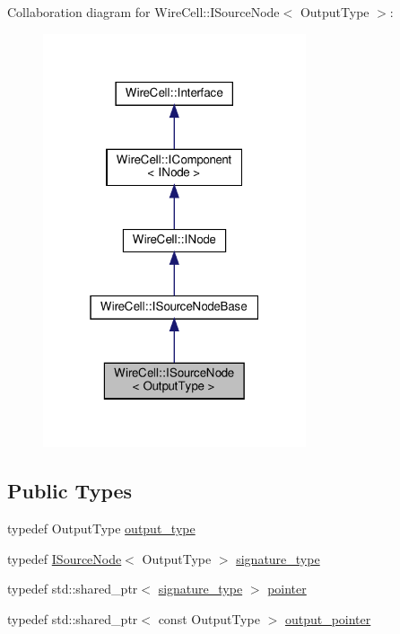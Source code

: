 Collaboration diagram for Wire\+Cell\+:\+:I\+Source\+Node$<$ Output\+Type $>$\+:
\nopagebreak
\begin{figure}[H]
\begin{center}
\leavevmode
\includegraphics[width=220pt]{class_wire_cell_1_1_i_source_node__coll__graph}
\end{center}
\end{figure}
\subsection*{Public Types}
\begin{DoxyCompactItemize}
\item 
typedef Output\+Type \hyperlink{class_wire_cell_1_1_i_source_node_a8db14c0eec2d0faac21bb1801d71600a}{output\+\_\+type}
\item 
typedef \hyperlink{class_wire_cell_1_1_i_source_node}{I\+Source\+Node}$<$ Output\+Type $>$ \hyperlink{class_wire_cell_1_1_i_source_node_ae80709587615faffda92fc12d7052bdc}{signature\+\_\+type}
\item 
typedef std\+::shared\+\_\+ptr$<$ \hyperlink{class_wire_cell_1_1_i_source_node_ae80709587615faffda92fc12d7052bdc}{signature\+\_\+type} $>$ \hyperlink{class_wire_cell_1_1_i_source_node_a960422a6c4fca9db6057f73704c2c6c3}{pointer}
\item 
typedef std\+::shared\+\_\+ptr$<$ const Output\+Type $>$ \hyperlink{class_wire_cell_1_1_i_source_node_ae2743237513016d7f69d68aac1104951}{output\+\_\+pointer}
\end{DoxyCompactItemize}
